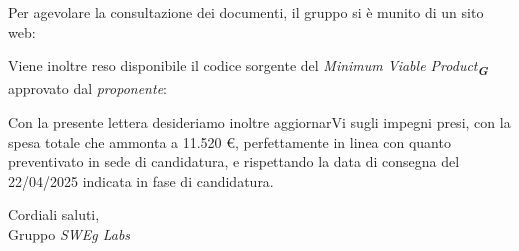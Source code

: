 Per agevolare la consultazione dei documenti, il gruppo si è munito di un sito web:
\begin{center}
\end{center}
Viene inoltre reso disponibile il codice sorgente del \emph{Minimum Viable Product}\textsubscript{\textit{\textbf{G}}} approvato dal \emph{proponente}: 
\begin{center}
\end{center}
Con la presente lettera desideriamo inoltre aggiornarVi sugli impegni presi, con la spesa totale che ammonta a 11.520 \euro, perfettamente in linea con quanto preventivato in sede di candidatura, e rispettando la data di consegna del 22/04/2025 indicata in fase di candidatura.\\
\vspace{1.5cm}

Cordiali saluti,\\
Gruppo \emph{SWEg Labs}

